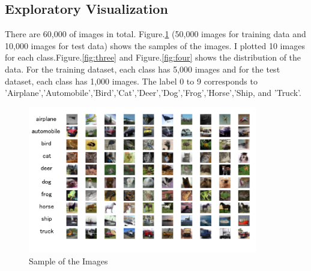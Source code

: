 \subsection{Exploratory Visualization}


There are 60,000 of images in total. Figure.\ref{fig:two} (50,000 images for training data and 10,000 images for test data) shows the samples of the images. I plotted 10 images for each class.Figure.\ref{fig:three} and Figure.\ref{fig:four} shows the distribution of the data. For the training dataset, each class has 5,000 images and for the test dataset, each class has 1,000 images.
The label 0 to 9 corresponds to 'Airplane','Automobile','Bird','Cat','Deer','Dog','Frog','Horse','Ship, and 'Truck'.
\begin{figure}[H]

\begin{center}
\includegraphics[width=10cm]{picture/random_sample.png}
\end{center}
\caption{Sample of the Images}
\label{fig:two}

\end{figure}

